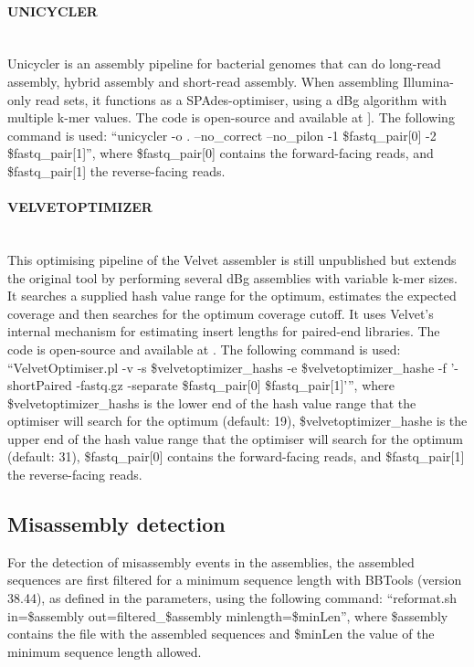 \paragraph{UNICYCLER} \mbox{}\\

Unicycler \cite{wick_unicycler_2017} is an assembly pipeline for bacterial genomes that can do long-read assembly, hybrid assembly and short-read assembly. When assembling Illumina-only read sets, it functions as a SPAdes-optimiser, using a  dBg algorithm with multiple k-mer values. The code is open-source and available at \cite{wick_unicycler_2022}]. The following command is used: “unicycler -o . --no\_correct --no\_pilon -1 \$fastq\_pair[0] -2 \$fastq\_pair[1]”, where \$fastq\_pair[0] contains the forward-facing reads, and \$fastq\_pair[1] the reverse-facing reads.

\paragraph{VELVETOPTIMIZER} \mbox{}\\

This optimising pipeline of the Velvet assembler \cite{zerbino_velvet_2008} is still unpublished but extends the original tool by performing several dBg assemblies with variable k-mer sizes. It searches a supplied hash value range for the optimum, estimates the expected coverage and then searches for the optimum coverage cutoff. It uses Velvet’s internal mechanism for estimating insert lengths for paired-end libraries.  The code is open-source and available at \cite{seemann_velvetoptimiser_2021}. The following command is used: “VelvetOptimiser.pl -v -s \$velvetoptimizer\_hashs -e \$velvetoptimizer\_hashe -f '-shortPaired -fastq.gz -separate \$fastq\_pair[0] \$fastq\_pair[1]'”, where \$velvetoptimizer\_hashs is the lower end of the hash value range that the optimiser will search for the optimum (default: 19), \$velvetoptimizer\_hashe is the upper end of the hash value range that the optimiser will search for the optimum (default: 31), \$fastq\_pair[0] contains the forward-facing reads, and \$fastq\_pair[1] the reverse-facing reads.

\subsection{Misassembly detection} \label{chap5_sup_misassembly}

For the detection of misassembly events in the assemblies, the assembled sequences are first filtered for a minimum sequence length with BBTools \cite{bushnell_bbmerge_2017} (version 38.44), as defined in the parameters, using the following command: “reformat.sh in=\$assembly out=filtered\_\$assembly minlength=\$minLen”, where \$assembly contains the file with the assembled sequences and \$minLen the value of the minimum sequence length allowed. 

